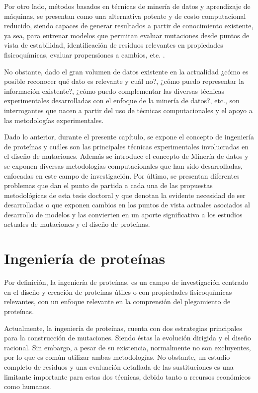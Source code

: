 Por otro lado, métodos basados en técnicas de minería de datos y aprendizaje de máquinas, se presentan como una alternativa potente y de costo computacional reducido, siendo capaces de generar resultados a partir de conocimiento existente, ya sea, para entrenar modelos que permitan evaluar mutaciones desde puntos de vista de estabilidad, identificación de residuos relevantes en propiedades fisicoquímicas, evaluar propensiones a cambios, etc. \cite{Capriotti2005, softwareVHL, article}. 

No obstante, dado el gran volumen de datos existente en la actualidad ¿cómo es posible reconocer qué dato es relevante y cuál no?, ¿cómo puedo representar la información existente?, ¿cómo puedo complementar las diversas técnicas experimentales desarrolladas con el enfoque de la minería de datos?, etc., son interrogantes que nacen a partir del uso de técnicas computacionales y el apoyo a las metodologías experimentales.

Dado lo anterior, durante el presente capítulo, se expone el concepto de ingeniería de proteínas y cuáles son las principales técnicas experimentales involucradas en el diseño de mutaciones. Además se introduce el concepto de Minería de datos y se exponen diversas metodologías computacionales que han sido desarrolladas, enfocadas en este campo de investigación. Por último, se presentan diferentes problemas que dan el punto de partida a cada una de las propuestas metodológicas de esta tesis doctoral y que denotan la evidente necesidad de ser desarrolladas o que exponen cambios en los puntos de vista actuales asociados al desarrollo de modelos y las convierten en un aporte significativo a los estudios actuales de mutaciones y el diseño de proteínas. 

\section{Ingeniería de proteínas \label{cap1:sec1}}

Por definición, la ingeniería de proteínas, es un campo de investigación centrado en el diseño y creación de proteínas útiles o con propiedades fisicoquímicas relevantes, con un enfoque relevante en la comprensión del plegamiento de proteínas.

Actualmente, la ingeniería de proteínas, cuenta con dos estrategias principales para la construcción de mutaciones. Siendo éstas la evolución dirigida y el diseño racional. Sin embargo, a pesar de su existencia, normalmente no son excluyentes, por lo que es común utilizar ambas metodologías. No obstante, un estudio completo de residuos y una evaluación detallada de las sustituciones es una limitante importante para estas dos técnicas, debido tanto a recursos económicos como humanos.

